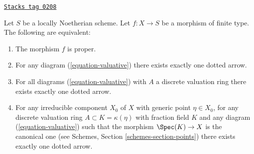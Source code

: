 \begin{lemma}
\label{limits-lemma-Noetherian-dvr-valuative-proper}
\href{https://stacks.math.columbia.edu/tag/0208}{\texttt{Stacks tag 0208}}

Let $S$ be a locally Noetherian scheme.
Let $f : X \to S$ be a morphism of finite type.
The following are equivalent:
\begin{enumerate}
\item The morphism $f$ is proper.
\item For any diagram (\ref{equation-valuative}) there exists exactly
one dotted arrow.
\item For all diagrams (\ref{equation-valuative}) with $A$ a discrete
valuation ring there exists exactly one dotted arrow.
\item For any irreducible component $X_0$ of $X$ with
generic point $\eta \in X_0$, for any discrete valuation ring
$A \subset K = \kappa(\eta)$ with fraction field $K$ and any
diagram (\ref{equation-valuative}) such that
the morphism $\Spec(K) \to X$ is the canonical one
(see
Schemes, Section \ref{schemes-section-points})
there exists exactly one dotted arrow.
\end{enumerate}
\end{lemma}

